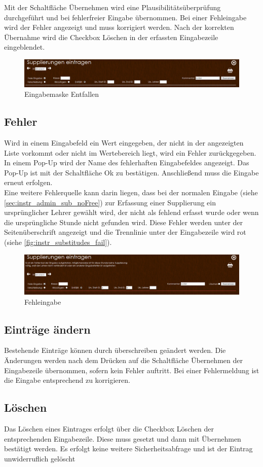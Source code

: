 Mit der Schaltfläche Übernehmen wird eine Plausibilitätsüberprüfung durchgeführt und bei fehlerfreier Eingabe übernommen. Bei einer Fehleingabe wird der Fehler angezeigt und muss korrigiert werden. Nach der korrekten Übernahme wird die Checkbox Löschen in der erfassten Eingabezeile eingeblendet.
\begin{figure}[H]
\centering
\includegraphics[keepaspectratio=true, width=14cm]{images/screenshots/substitudes_remove.png}
\caption{Eingabemaske Entfallen}
\label{fig:instr_substitudes_subRemove}
\end{figure}
\subsection{Fehler}
Wird in einem Eingabefeld ein Wert eingegeben, der nicht in der angezeigten Liste vorkommt oder nicht im Wertebereich liegt, wird ein Fehler zurückgegeben. In einem Pop-Up wird der Name des fehlerhaften Eingabefeldes angezeigt. Das Pop-Up ist mit der Schaltfläche Ok zu bestätigen. Anschließend muss die Eingabe erneut erfolgen.\\
Eine weitere Fehlerquelle kann darin liegen, dass bei der normalen Eingabe (siehe \autoref{sec:instr_admin_sub_noFree}) zur Erfassung einer Supplierung ein ursprünglicher Lehrer gewählt wird, der nicht als fehlend erfasst wurde oder wenn die ursprüngliche Stunde nicht gefunden wird. Diese Fehler werden unter der Seitenüberschrift angezeigt und die Trennlinie unter der Eingabezeile wird rot (siehe \autoref{fig:instr_substitudes_fail}).
\begin{figure}[H]
\centering
\includegraphics[keepaspectratio=true, width=14cm]{images/screenshots/substitudes_fail.png}
\caption{Fehleingabe}
\label{fig:instr_substitudes_fail}
\end{figure}
\subsection{Einträge ändern}
Bestehende Einträge können durch überschreiben geändert werden. Die Änderungen werden nach dem Drücken auf die Schaltfläche Übernehmen der Eingabezeile übernommen, sofern kein Fehler auftritt. Bei einer Fehlermeldung ist die Eingabe entsprechend zu korrigieren.
\subsection{Löschen}
Das Löschen eines Eintrages erfolgt über die Checkbox Löschen der entsprechenden Eingabezeile. Diese muss gesetzt und dann mit Übernehmen bestätigt werden. Es erfolgt keine weitere Sicherheitsabfrage und ist der Eintrag unwiderruflich gelöscht
